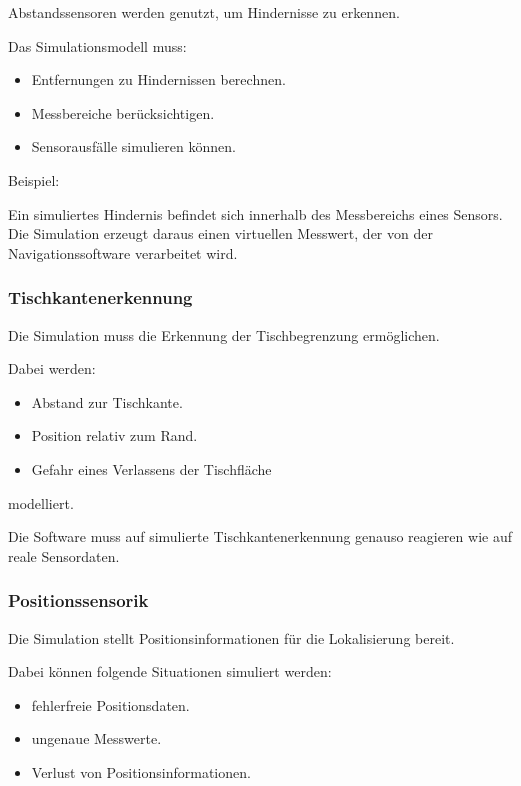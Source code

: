 \documentclass[
  a4paper,
  12pt,
  DIV=12,        %
  parskip=half,  %
  headings=small %
]{scrartcl}
\theoremstyle{definition}
\providecommand{\tightlist}{%
  \setlength{\itemsep}{0pt}\setlength{\parskip}{0pt}}
\theoremstyle{definition}
\begin{document}
Abstandssensoren werden genutzt, um Hindernisse zu erkennen.

Das Simulationsmodell muss:

\begin{itemize}
\tightlist
\item
  Entfernungen zu Hindernissen berechnen.
\item
  Messbereiche berücksichtigen.
\item
  Sensorausfälle simulieren können.
\end{itemize}

Beispiel:

Ein simuliertes Hindernis befindet sich innerhalb des Messbereichs eines
Sensors. Die Simulation erzeugt daraus einen virtuellen Messwert, der
von der Navigationssoftware verarbeitet wird.

\subsubsection{Tischkantenerkennung}\label{tischkantenerkennung-1}

Die Simulation muss die Erkennung der Tischbegrenzung ermöglichen.

Dabei werden:

\begin{itemize}
\tightlist
\item
  Abstand zur Tischkante.
\item
  Position relativ zum Rand.
\item
  Gefahr eines Verlassens der Tischfläche
\end{itemize}

modelliert.

Die Software muss auf simulierte Tischkantenerkennung genauso reagieren
wie auf reale Sensordaten.

\subsubsection{Positionssensorik}\label{positionssensorik}

Die Simulation stellt Positionsinformationen für die Lokalisierung
bereit.

Dabei können folgende Situationen simuliert werden:

\begin{itemize}
\tightlist
\item
  fehlerfreie Positionsdaten.
\item
  ungenaue Messwerte.
\item
  Verlust von Positionsinformationen.
\end{itemize}
\end{document}
